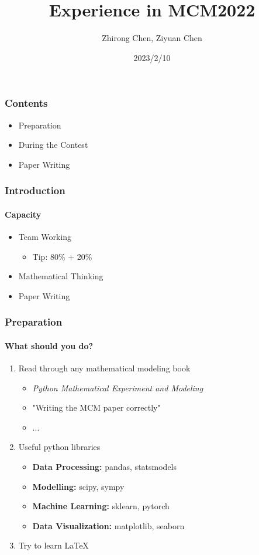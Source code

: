 \documentclass{beamer}
\title{Experience in MCM2022}
\author{Zhirong Chen, Ziyuan Chen}
\institute{ZJUI Institute}
\date{2023/2/10}
\begin{document}
\frame{\titlepage}
\begin{frame}
    \frametitle{Contents}
    \begin{itemize}
        \setlength{\itemsep}{20pt}
        \setlength{\parsep}{6pt}
        \setlength{\parskip}{3pt}
        \item Preparation
        \item During the Contest
        \item Paper Writing
    \end{itemize}
\end{frame}


\begin{frame}
    \frametitle{Introduction}
    \framesubtitle{Capacity}
    \begin{itemize}
        \setlength{\itemsep}{7pt}
        \item Team Working
        \begin{itemize}
            \item Tip: 80\% + 20\%
        \end{itemize}
        \item Mathematical Thinking
        \item Paper Writing
    \end{itemize}
\end{frame}


\begin{frame}
    \frametitle{Preparation}
    \framesubtitle{What should you do?}
    \begin{enumerate}
        \item Read through any mathematical modeling book
        \begin{itemize}
            \item \textit{Python Mathematical Experiment and Modeling}
            \item "Writing the MCM paper correctly"
            \item ...
        \end{itemize}
        \item Useful python libraries
        \begin{itemize}
            \item \textbf{Data Processing:} pandas, statsmodels
            \item \textbf{Modelling:} scipy, sympy
            \item \textbf{Machine Learning:} sklearn, pytorch
            \item \textbf{Data Visualization:} matplotlib, seaborn
        \end{itemize}
        \item Try to learn \LaTeX
    \end{enumerate}
\end{frame}
\end{document}
